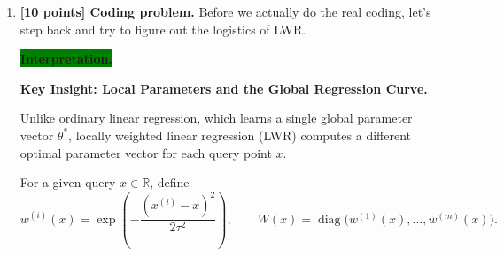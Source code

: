 \documentclass[10pt]{article}
\begin{document}
\begin{enumerate}
\begin{enumerate}[label=(\alph*)]
\begin{enumerate}[label=\roman*.]
Taking the logarithm, we obtain
\[
\begin{aligned}
\ell(\theta)
:=\log L(\theta)
&=-m\log\sqrt{2\pi}
-\sum_{i=1}^{m}\log\sigma^{(i)}\\
&\quad
-\frac12\sum_{i=1}^{m}
\frac{(y^{(i)}-\theta^Tx^{(i)})^2}
{(\sigma^{(i)})^2}.
\end{aligned}
\]

Since the first two terms are independent of $\theta$,
maximizing the log-likelihood is equivalent to minimizing
the negative of the remaining term. Hence,
\[
\begin{aligned}
\hat{\theta}_{\mathrm{MLE}}
&=\arg\max_{\theta}\ell(\theta)\\
&=\arg\min_{\theta}
\frac12\sum_{i=1}^{m}
\frac{1}{(\sigma^{(i)})^2}
\left(\theta^Tx^{(i)}-y^{(i)}\right)^2.
\end{aligned}
\]

Comparing this objective with the weighted least-squares
objective
\[
J(\theta)
=
\frac12\sum_{i=1}^{m}
w^{(i)}
\left(\theta^Tx^{(i)}-y^{(i)}\right)^2,
\]
we identify the weights as
\[
\boxed{
w^{(i)}=\frac{1}{(\sigma^{(i)})^2},
\qquad i=1,\ldots,m.
}
\]

Therefore, maximum likelihood estimation under independent
Gaussian observations with known, potentially different
variances is equivalent to solving a weighted linear
regression problem, where each observation is weighted
inversely proportional to its noise variance.

\end{enumerate}


\item \textbf{[10 points] Coding problem.}
Before we actually do the real coding, let's step back and try to figure out the logistics 
of LWR.


\medskip
\noindent\colorbox{green}{\textbf{Interpretation.}}
\vspace{3mm}

\noindent\textbf{Key Insight: Local Parameters and the Global Regression Curve.}

Unlike ordinary linear regression, which learns a single global
parameter vector $\theta^*$, locally weighted linear regression
(LWR) computes a different optimal parameter vector for each
query point $x$.

For a given query $x\in\mathbb{R}$, define
\[
w^{(i)}(x)
=
\exp\left(
-\frac{(x^{(i)}-x)^2}{2\tau^2}
\right),
\qquad
W(x)=\operatorname{diag}\bigl(w^{(1)}(x),\ldots,w^{(m)}(x)\bigr).
\]


\end{enumerate}
\end{enumerate}
\end{document}
